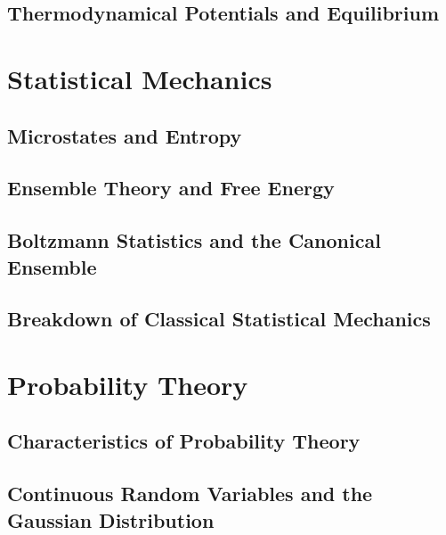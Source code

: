 \documentclass[12pt, a4paper, oneside, openright, titlepage]{book}
\begin{document}
\chapter{Thermodynamical Potentials and Equilibrium}




\part{Statistical Mechanics}


\chapter{Microstates and Entropy}



\chapter{Ensemble Theory and Free Energy}



\chapter{Boltzmann Statistics and the Canonical Ensemble}



\chapter{Breakdown of Classical Statistical Mechanics}



\part{Probability Theory}


\chapter{Characteristics of Probability Theory}


\chapter{Continuous Random Variables and the Gaussian Distribution}
\end{document}
